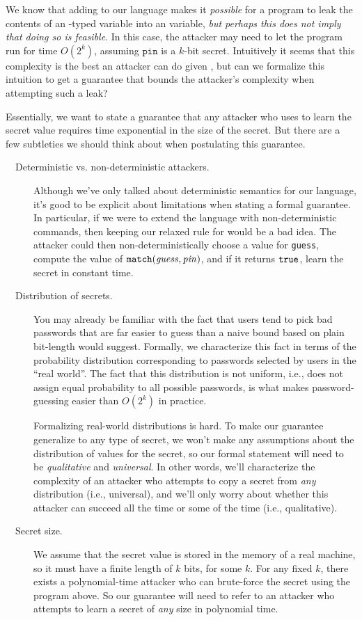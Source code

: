 \documentclass[11pt,twoside]{scrartcl}
\begin{document}
We know that adding  to our language makes it \emph{possible} for a program to leak the contents of an \hisec-typed variable into an \lowsec variable, \emph{but perhaps this does not imply that doing so is feasible}. In this case, the attacker may need to let the program run for time $O(2^k)$, assuming $\mathtt{pin}$ is a $k$-bit secret. Intuitively it seems that this complexity is the best an attacker can do given , but can we formalize this intuition to get a guarantee that bounds the attacker's complexity when attempting such a leak?

Essentially, we want to state a guarantee that any attacker who uses  to learn the secret value requires time exponential in the size of the secret. But there are a few subtleties we should think about when postulating this guarantee.
\begin{description}
\item[\ \ Deterministic vs. non-deterministic attackers.] Although we've only talked about deterministic semantics for our language, it's good to be explicit about limitations when stating a formal guarantee. In particular, if we were to extend the language with non-deterministic commands, then keeping our relaxed rule for  would be a bad idea. The attacker could then non-deterministically choose a value for \texttt{guess}, compute the value of $\texttt{\upshape match}(\mathit{guess},\mathit{pin})$, and if it returns $\texttt{\upshape true}$, learn the secret in constant time.

\item[\ \ Distribution of secrets.] You may already be familiar with the fact that users tend to pick bad passwords that are far easier to guess than a naive bound based on plain bit-length would suggest. Formally, we characterize this fact in terms of the probability distribution corresponding to passwords selected by users in the ``real world''. The fact that this distribution is not uniform, i.e., does not assign equal probability to all possible passwords, is what makes password-guessing easier than $O(2^k)$ in practice. 

Formalizing real-world distributions is hard. To make our guarantee generalize to any type of secret, we won't make any assumptions about the distribution of values for the secret, so our formal statement will need to be \emph{qualitative} and \emph{universal}. In other words, we'll characterize the complexity of an attacker who attempts to copy a secret from \emph{any} distribution (i.e., universal), and we'll only worry about whether this attacker can succeed all the time or some of the time (i.e., qualitative).

\item[\ \ Secret size.] We assume that the secret value is stored in the memory of a real machine, so it must have a finite length of $k$ bits, for some $k$. For any fixed $k$, there exists a polynomial-time attacker who can brute-force the secret using the program above. So our guarantee will need to refer to an attacker who attempts to learn a secret of \emph{any} size in polynomial time.
\end{description}
\end{document}

